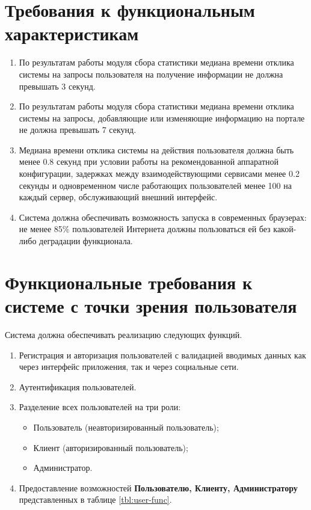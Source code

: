 \section*{Требования к функциональным характеристикам}
\begin{enumerate}
	\item По результатам работы модуля сбора статистики медиана времени отклика системы на запросы пользователя на получение информации не должна превышать 3 секунд.
	
	\item По результатам работы модуля сбора статистики медиана времени отклика системы на запросы, добавляющие или изменяющие информацию на портале не должна превышать 7 секунд.
	
	\item Медиана времени отклика системы на действия пользователя должна быть менее 0.8 секунд при условии работы на рекомендованной аппаратной конфигурации, задержках между взаимодействующими сервисами менее 0.2 секунды и одновременном числе работающих пользователей менее 100 на каждый сервер, обслуживающий внешний интерфейс.
	
	\item Система должна обеспечивать возможность запуска в современных браузерах: не менее 85\% пользователей Интернета должны пользоваться ей без какой-либо деградации функционала.
\end{enumerate}

\section*{Функциональные требования к системе с точки зрения пользователя}
Система должна обеспечивать реализацию следующих функций.
\begin{enumerate}
	\item Регистрация и авторизация пользователей с валидацией вводимых данных как через интерфейс приложения, так и через	социальные сети.
	
	\item Аутентификация пользователей.
	
	\item Разделение всех пользователей на три роли:
	\begin{itemize}
		\item Пользователь (неавторизированный пользователь);
		
		\item Клиент (авторизированный пользователь);
		
		\item Администратор.
	\end{itemize}
	
	\item Предоставление возможностей \textbf{Пользователю, Клиенту, Администратору} представленных в таблице \ref{tbl:user-func}.
\end{enumerate}

